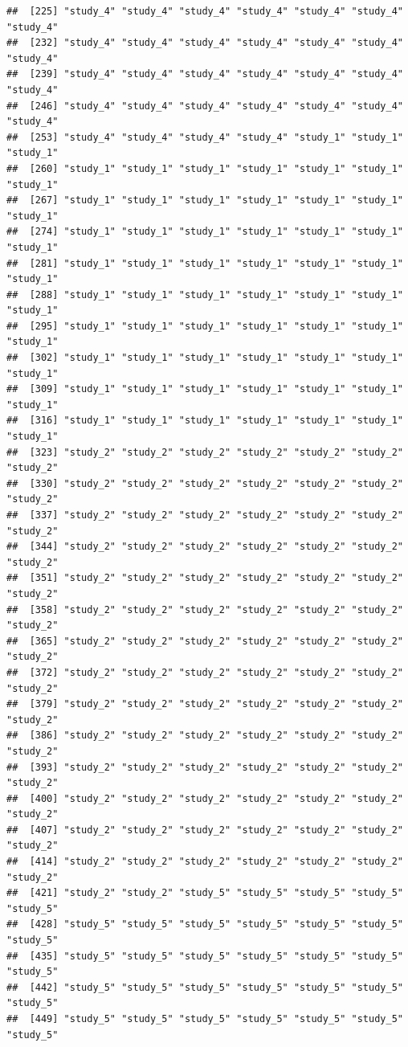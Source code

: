\documentclass[
  american,
  man,floatsintext]{apa7}
\begin{document}
\begin{verbatim}
##  [225] "study_4" "study_4" "study_4" "study_4" "study_4" "study_4" "study_4"
##  [232] "study_4" "study_4" "study_4" "study_4" "study_4" "study_4" "study_4"
##  [239] "study_4" "study_4" "study_4" "study_4" "study_4" "study_4" "study_4"
##  [246] "study_4" "study_4" "study_4" "study_4" "study_4" "study_4" "study_4"
##  [253] "study_4" "study_4" "study_4" "study_4" "study_1" "study_1" "study_1"
##  [260] "study_1" "study_1" "study_1" "study_1" "study_1" "study_1" "study_1"
##  [267] "study_1" "study_1" "study_1" "study_1" "study_1" "study_1" "study_1"
##  [274] "study_1" "study_1" "study_1" "study_1" "study_1" "study_1" "study_1"
##  [281] "study_1" "study_1" "study_1" "study_1" "study_1" "study_1" "study_1"
##  [288] "study_1" "study_1" "study_1" "study_1" "study_1" "study_1" "study_1"
##  [295] "study_1" "study_1" "study_1" "study_1" "study_1" "study_1" "study_1"
##  [302] "study_1" "study_1" "study_1" "study_1" "study_1" "study_1" "study_1"
##  [309] "study_1" "study_1" "study_1" "study_1" "study_1" "study_1" "study_1"
##  [316] "study_1" "study_1" "study_1" "study_1" "study_1" "study_1" "study_1"
##  [323] "study_2" "study_2" "study_2" "study_2" "study_2" "study_2" "study_2"
##  [330] "study_2" "study_2" "study_2" "study_2" "study_2" "study_2" "study_2"
##  [337] "study_2" "study_2" "study_2" "study_2" "study_2" "study_2" "study_2"
##  [344] "study_2" "study_2" "study_2" "study_2" "study_2" "study_2" "study_2"
##  [351] "study_2" "study_2" "study_2" "study_2" "study_2" "study_2" "study_2"
##  [358] "study_2" "study_2" "study_2" "study_2" "study_2" "study_2" "study_2"
##  [365] "study_2" "study_2" "study_2" "study_2" "study_2" "study_2" "study_2"
##  [372] "study_2" "study_2" "study_2" "study_2" "study_2" "study_2" "study_2"
##  [379] "study_2" "study_2" "study_2" "study_2" "study_2" "study_2" "study_2"
##  [386] "study_2" "study_2" "study_2" "study_2" "study_2" "study_2" "study_2"
##  [393] "study_2" "study_2" "study_2" "study_2" "study_2" "study_2" "study_2"
##  [400] "study_2" "study_2" "study_2" "study_2" "study_2" "study_2" "study_2"
##  [407] "study_2" "study_2" "study_2" "study_2" "study_2" "study_2" "study_2"
##  [414] "study_2" "study_2" "study_2" "study_2" "study_2" "study_2" "study_2"
##  [421] "study_2" "study_2" "study_5" "study_5" "study_5" "study_5" "study_5"
##  [428] "study_5" "study_5" "study_5" "study_5" "study_5" "study_5" "study_5"
##  [435] "study_5" "study_5" "study_5" "study_5" "study_5" "study_5" "study_5"
##  [442] "study_5" "study_5" "study_5" "study_5" "study_5" "study_5" "study_5"
##  [449] "study_5" "study_5" "study_5" "study_5" "study_5" "study_5" "study_5"

\end{verbatim}
\end{document}
